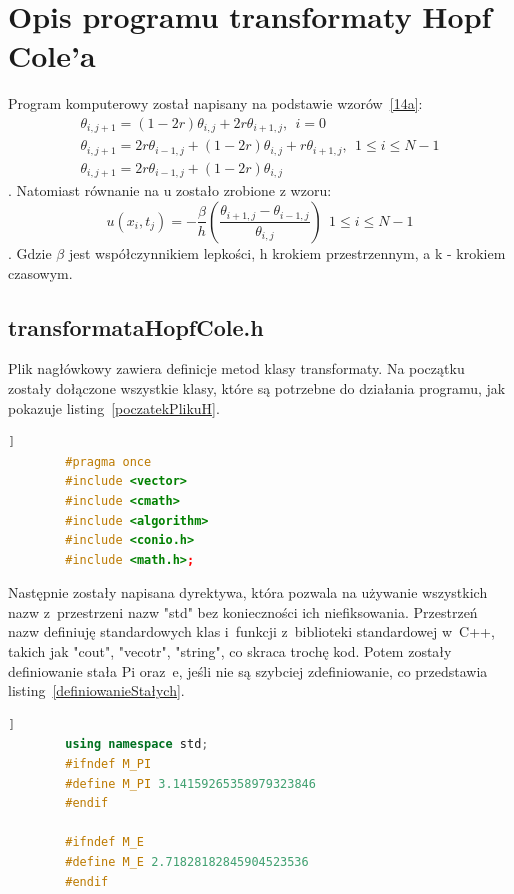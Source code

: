 \documentclass[a4paper,11pt]{article}
\begin{document}
	\section{Opis programu transformaty Hopf Cole'a}
Program komputerowy został napisany na podstawie wzorów~\ref{14a}:
\begin{equation}
\label{14a}
\begin{split}
    \theta_{i,j+1}=(1-2r)\theta_{i,j}+2r\theta_{i+1,j}, \ \ i=0\\
    \theta_{i,j+1}=2r\theta_{i-1,j}+(1-2r)\theta_{i,j}+r\theta_{i+1,j}, \ \ 1\le i\le N-1\\
    \theta_{i,j+1}=2r\theta_{i-1,j}+(1-2r)\theta_{i,j}
\end{split}
\end{equation}.
Natomiast równanie na u zostało zrobione z wzoru:
\begin{equation}
    u(x_i,t_j)=-\frac{\beta}{h}\left(\frac{\theta_{i+1,j}-\theta_{i-1,j}}{\theta_{i,j}}\right)\ \ 1\le i\le N-1
\end{equation}.
Gdzie $\beta$ jest współczynnikiem lepkości, h krokiem przestrzennym, a k - krokiem czasowym.
	\subsection{transformataHopfCole.h}
	Plik nagłówkowy zawiera definicje metod klasy transformaty. Na początku zostały dołączone wszystkie klasy, które są potrzebne do działania programu, jak pokazuje listing~\ref{poczatekPlikuH}.
		\begin{lstlisting}[caption={początek pliku transformataHopfCole.h},label={poczatekPlikuH}, language=C++]]
		#pragma once
		#include <vector>
		#include <cmath>
		#include <algorithm>
		#include <conio.h>
		#include <math.h>;\end{lstlisting}
	Następnie zostały napisana dyrektywa, która pozwala na używanie wszystkich nazw z~przestrzeni nazw "std" bez konieczności ich niefiksowania. Przestrzeń nazw definiuję standardowych klas i~funkcji z~biblioteki standardowej w~C++, takich jak "cout", "vecotr", "string", co skraca trochę kod. Potem zostały definiowanie stała Pi oraz~e, jeśli nie są szybciej zdefiniowanie, co przedstawia listing~\ref{definiowanieStałych}. 
	\begin{lstlisting}[caption={początek pliku definiowanieStałych},label={zdefiniowanie stałych}, language=C++]]
		using namespace std;
		#ifndef M_PI
		#define M_PI 3.14159265358979323846
		#endif
		
		#ifndef M_E
		#define M_E 2.71828182845904523536
		#endif\end{lstlisting}
		
\end{document}
